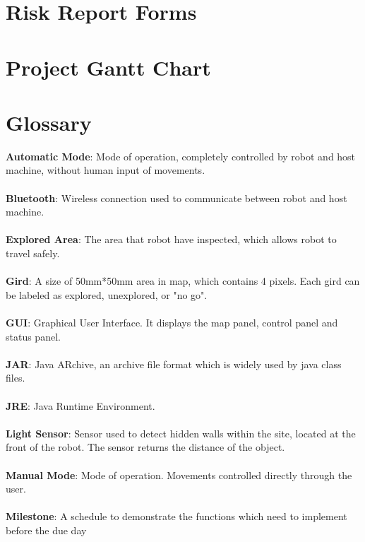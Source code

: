 \documentclass[11pt, a4paper]{report}
\begin{document}
\pagebreak


\newpage
\appendix

\chapter{Risk Report Forms}



\chapter{Project Gantt Chart}



\chapter{Glossary}
\textbf{Automatic Mode}:  Mode of operation, completely controlled by robot and host machine, without human input of movements. \\
\\ \textbf{Bluetooth}: Wireless connection used to communicate between robot and host machine.\\
\\ \textbf{Explored Area}: The area that robot have inspected, which allows robot to travel safely.  \\
\\ \textbf{Gird}: A size of 50mm*50mm area in map, which contains 4 pixels. Each gird can be labeled as explored, unexplored, or "no go".\\
\\ \textbf{GUI}: Graphical User Interface. It displays the map panel, control panel and status panel.\\
\\ \textbf{JAR}: Java ARchive, an archive file format which is widely used by java class files.\\
\\ \textbf{JRE}: Java Runtime Environment.\\ 
\\ \textbf{Light Sensor}: Sensor used to detect hidden walls within the site, located at the front of the robot. The sensor returns the distance of the object.\\
\\ \textbf{Manual Mode}: Mode of operation. Movements controlled directly through the user.\\
\\ \textbf{Milestone}: A schedule to demonstrate the functions which need to implement before the due day\\
\end{document}
